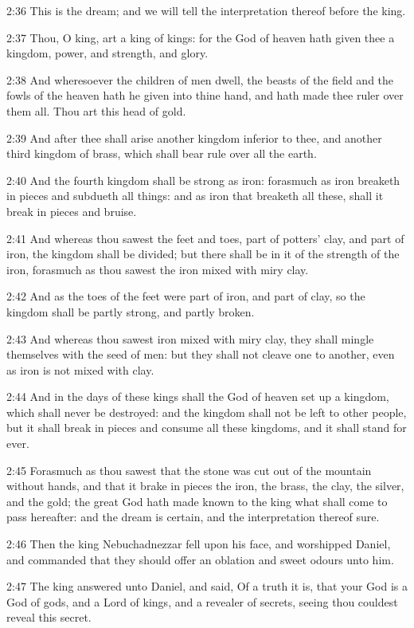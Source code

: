 2:36 This is the dream; and we will tell the interpretation thereof
before the king.

2:37 Thou, O king, art a king of kings: for the God of heaven hath
given thee a kingdom, power, and strength, and glory.

2:38 And wheresoever the children of men dwell, the beasts of the
field and the fowls of the heaven hath he given into thine hand, and
hath made thee ruler over them all. Thou art this head of gold.

2:39 And after thee shall arise another kingdom inferior to thee, and
another third kingdom of brass, which shall bear rule over all the
earth.

2:40 And the fourth kingdom shall be strong as iron: forasmuch as iron
breaketh in pieces and subdueth all things: and as iron that breaketh
all these, shall it break in pieces and bruise.

2:41 And whereas thou sawest the feet and toes, part of potters' clay,
and part of iron, the kingdom shall be divided; but there shall be in
it of the strength of the iron, forasmuch as thou sawest the iron
mixed with miry clay.

2:42 And as the toes of the feet were part of iron, and part of clay,
so the kingdom shall be partly strong, and partly broken.

2:43 And whereas thou sawest iron mixed with miry clay, they shall
mingle themselves with the seed of men: but they shall not cleave one
to another, even as iron is not mixed with clay.

2:44 And in the days of these kings shall the God of heaven set up a
kingdom, which shall never be destroyed: and the kingdom shall not be
left to other people, but it shall break in pieces and consume all
these kingdoms, and it shall stand for ever.

2:45 Forasmuch as thou sawest that the stone was cut out of the
mountain without hands, and that it brake in pieces the iron, the
brass, the clay, the silver, and the gold; the great God hath made
known to the king what shall come to pass hereafter: and the dream is
certain, and the interpretation thereof sure.

2:46 Then the king Nebuchadnezzar fell upon his face, and worshipped
Daniel, and commanded that they should offer an oblation and sweet
odours unto him.

2:47 The king answered unto Daniel, and said, Of a truth it is, that
your God is a God of gods, and a Lord of kings, and a revealer of
secrets, seeing thou couldest reveal this secret.

